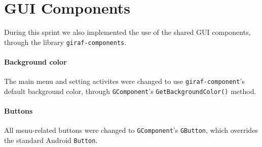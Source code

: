 \section{GUI Components}
During this sprint we also implemented the use of the shared GUI components, through the library \lstinline|giraf-components|.

\paragraph{Background color}
The main menu and setting activites were changed to use \lstinline|giraf-component|'s default background color, through \lstinline|GComponent|'s \lstinline|GetBackgroundColor()| method.

\paragraph{Buttons}
All menu-related buttons were changed to \lstinline|GComponent|'s \lstinline|GButton|, which overrides the standard Android \lstinline|Button|.